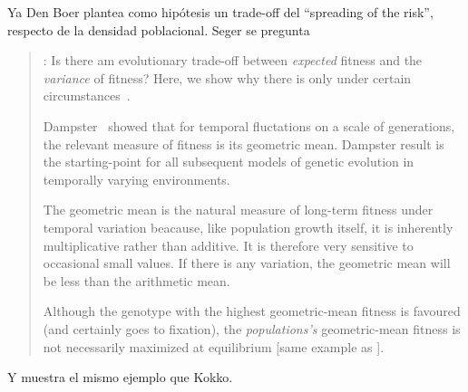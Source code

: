 \documentclass[a4paper,10pt]{article}
\begin{document}
Ya Den Boer plantea como hipótesis un trade-off del ``spreading of the risk'', respecto de la densidad poblacional.
Seger se pregunta
\begin{quotation} \cite{denBoer1968-spreadingRisk}:
    Is there am evolutionary trade-off between \emph{expected} fitness and the \emph{variance} of fitness?
    Here, we show why there is only under certain circumstances~\cite{seger1987-betHedging}.

    Dampster~\cite{dempster1955-geometricMean} showed that for temporal fluctations on a scale of generations, the relevant measure of fitness is its geometric mean.
    Dampster result is the starting-point for all subsequent models of genetic evolution in temporally varying environments.

    The geometric mean is the natural measure of long-term fitness under temporal variation beacause, like population growth itself, it is inherently multiplicative rather than additive.
    It is therefore very sensitive to occasional small values.
    If there is any variation, the geometric mean will be less than the arithmetic mean.

    Although the genotype with the highest geometric-mean fitness is favoured (and certainly goes to fixation), the \emph{populations's} geometric-mean fitness is not necessarily maximized at equilibrium [same example as \cite{starrfelt2012-bet}].
\end{quotation}
Y muestra el mismo ejemplo que Kokko.

\\
\end{document}
